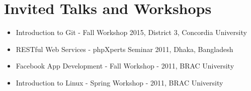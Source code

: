 \documentclass[a4paper,11pt]{article}
\newcommand{\resumeItem}[1]{
  \item\small{#1}
}
\newcommand{\resumeItemListStart}{\begin{itemize}[rightmargin=0.11in]}
\newcommand{\resumeItemListEnd}{\end{itemize}}
\begin{document}

\section{Invited Talks and Workshops}
  \resumeItemListStart{}
    \resumeItem{Introduction to Git - Fall Workshop 2015, District 3, Concordia University}
    \resumeItem{RESTful Web Services - phpXperts Seminar 2011, Dhaka, Bangladesh}
    \resumeItem{Facebook App Development - Fall Workshop - 2011, BRAC University}
    \resumeItem{Introduction to Linux - Spring Workshop - 2011, BRAC University}
  \resumeItemListEnd{}
\end{document}
